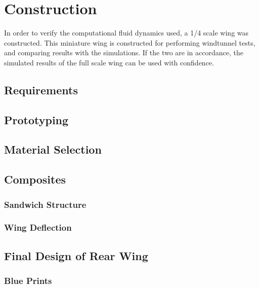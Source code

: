 \chapter{Construction}

  In order to verify the computational fluid dynamics used, a 1/4 scale wing was constructed. This miniature wing is constructed for performing windtunnel tests, and comparing results with the simulations. If the two are in accordance, the simulated results of the full scale wing can be used with confidence.

\section{Requirements}


\section{Prototyping}

\section{Material Selection}

\section{Composites}
  \subsection{Sandwich Structure}
  \subsection{Wing Deflection}

\section{Final Design of Rear Wing}

  \subsection{Blue Prints}

